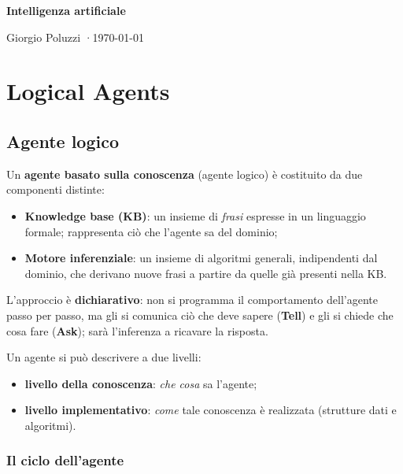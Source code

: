\documentclass[11pt, a4paper]{article}
\renewcommand{\emph}[1]{\textcolor{verdechiaro}{\itshape #1}}
\begin{document}
\begingroup
  \raggedright
  {\sffamily\bfseries\Huge\color{arancio} Intelligenza artificiale\par}
  \vspace{4pt}
  {\sffamily\color{tenue} Giorgio Poluzzi \quad·\quad \today\par}
\endgroup
\vspace{1.6\baselineskip}

\section{Logical Agents}

\subsection{Agente logico}

Un \textbf{agente basato sulla conoscenza} (agente logico) è costituito da due componenti distinte:

\begin{itemize}
  \item \textbf{Knowledge base (KB)}: un insieme di \emph{frasi} espresse in un linguaggio formale; rappresenta ciò che l'agente sa del dominio;
  \item \textbf{Motore inferenziale}: un insieme di algoritmi generali, indipendenti dal dominio, che derivano nuove frasi a partire da quelle già presenti nella KB.
\end{itemize}

L'approccio è \textbf{dichiarativo}: non si programma il comportamento dell'agente passo per passo, ma gli si comunica ciò che deve sapere (\textbf{Tell}) e gli si chiede che cosa fare (\textbf{Ask}); sarà l'inferenza a ricavare la risposta.

Un agente si può descrivere a due livelli:
\begin{itemize}
  \item \textbf{livello della conoscenza}: \emph{che cosa} sa l'agente;
  \item \textbf{livello implementativo}: \emph{come} tale conoscenza è realizzata (strutture dati e algoritmi).
\end{itemize}

\subsubsection*{Il ciclo dell'agente}
\end{document}
